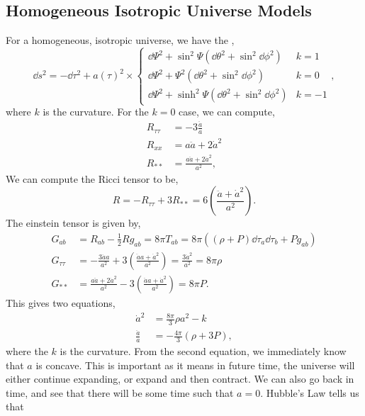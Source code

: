 \documentclass{article}
\numberwithin{equation}{section}
\begin{document}
\subsection{Homogeneous Isotropic Universe Models}
For a homogeneous, isotropic universe, we have the ,
\begin{equation}
    \dd{s}^2 = -\dd\tau^2 + a(\tau)^2 \times \begin{cases}
        \dd{\Psi}^2 + \sin^2\Psi(\dd{\theta}^2+\sin^2 \dd{\phi}^2) & k = 1 \\ 
        \dd{\Psi}^2 + \Psi^2(\dd{\theta}^2+\sin^2 \dd{\phi}^2) & k = 0 \\ 
        \dd{\Psi}^2 + \sinh^2\Psi(\dd{\theta}^2+\sin^2 \dd{\phi}^2) & k = -1 
    \end{cases},
\end{equation}
where $k$ is the curvature. For the $k=0$ case, we can compute,
\begin{align*}
    R_{\tau\tau} &= -3\frac{\ddot{a}}{a} \\ 
    R_{xx} &= a\ddot{a} + 2\dot{a}^2 \\ 
    R_{**} &= \frac{a\ddot{a}+2\dot{a}^2}{a^2},
\end{align*}
We can compute the Ricci tensor to be,
\begin{equation}
    R = - R_{\tau\tau} + 3R_{**} = 6\left(\frac{\ddot{a}+\dot{a}^2}{a^2}\right).
\end{equation}
The einstein tensor is given by,
\begin{align*}
    G_{ab} &= R_{ab} - \frac{1}{2}Rg_{ab} = 8\pi T_{ab} = 8\pi\left((\rho+P)\dd{\tau}_a\dd{\tau}_b + Pg_{ab}\right) \\ 
    G_{\tau\tau} &= -\frac{3\ddot{a}a}{a^2} + 3\left(\frac{\ddot{a}a+\dot{a}^2}{a^2}\right) = \frac{3\dot{a}^2}{a^2} = 8\pi \rho \\ 
    G_{**} &= \frac{a\ddot{a}+2\dot{a}^2}{a^2} - 3\left(\frac{\ddot{a}a+\dot{a}^2}{a^2}\right) = 8\pi P.
\end{align*}
This gives two equations,
\begin{align*}
    \dot{a}^2 &= \frac{8\pi}{3}\rho a^2 - k \\ 
    \frac{\ddot{a}}{a} &= -\frac{4\pi}{3}\left(\rho+3P\right),
\end{align*}
where the $k$ is the curvature. From the second equation, we immediately know that $a$ is concave. This is important as it means in future time, the universe will either continue expanding, or expand and then contract. We can also go back in time, and see that there will be some time such that $a=0.$ Hubble's Law tells us that 
\end{document}
